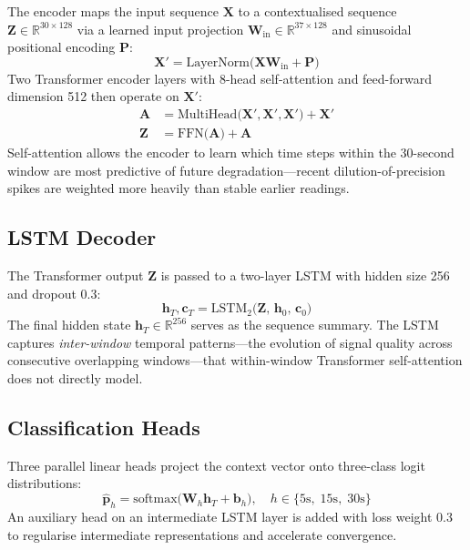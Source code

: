 \documentclass[pdflatex,sn-mathphys-num]{sn-jnl}
\begin{document}
The encoder maps the input sequence $\mathbf{X}$ to a contextualised sequence
$\mathbf{Z} \in \mathbb{R}^{30 \times 128}$ via a learned input projection
$\mathbf{W}_\text{in} \in \mathbb{R}^{37 \times 128}$ and sinusoidal
positional encoding $\mathbf{P}$:
\begin{equation}
  \mathbf{X}' = \text{LayerNorm}\bigl(\mathbf{X}\mathbf{W}_\text{in}
  + \mathbf{P}\bigr)
\end{equation}
Two Transformer encoder layers \cite{[AuthorYear_Vaswani_2017]} with
8-head self-attention and feed-forward dimension 512 then operate on
$\mathbf{X}'$:
\begin{align}
  \mathbf{A} &= \text{MultiHead}\bigl(\mathbf{X}', \mathbf{X}',
    \mathbf{X}'\bigr) + \mathbf{X}' \\
  \mathbf{Z} &= \text{FFN}\bigl(\mathbf{A}\bigr) + \mathbf{A}
\end{align}
Self-attention allows the encoder to learn which time steps within the
30-second window are most predictive of future degradation---recent
dilution-of-precision spikes are weighted more heavily than stable earlier
readings.

\subsection{LSTM Decoder}

The Transformer output $\mathbf{Z}$ is passed to a two-layer LSTM
\cite{[AuthorYear_Hochreiter_LSTM_1997]} with hidden size 256 and dropout
0.3:
\begin{equation}
  \mathbf{h}_T, \mathbf{c}_T
  = \text{LSTM}_2\bigl(\mathbf{Z},\, \mathbf{h}_0,\, \mathbf{c}_0\bigr)
\end{equation}
The final hidden state $\mathbf{h}_T \in \mathbb{R}^{256}$ serves as the
sequence summary.  The LSTM captures \textit{inter-window} temporal
patterns---the evolution of signal quality across consecutive overlapping
windows---that within-window Transformer self-attention does not directly
model.

\subsection{Classification Heads}

Three parallel linear heads project the context vector onto three-class
logit distributions:
\begin{equation}
  \hat{\mathbf{p}}_h = \text{softmax}\bigl(
    \mathbf{W}_h \mathbf{h}_T + \mathbf{b}_h\bigr),
  \quad h \in \{5\text{s},\; 15\text{s},\; 30\text{s}\}
\end{equation}
An auxiliary head on an intermediate LSTM layer is added with loss weight
0.3 to regularise intermediate representations and accelerate convergence.
\end{document}
